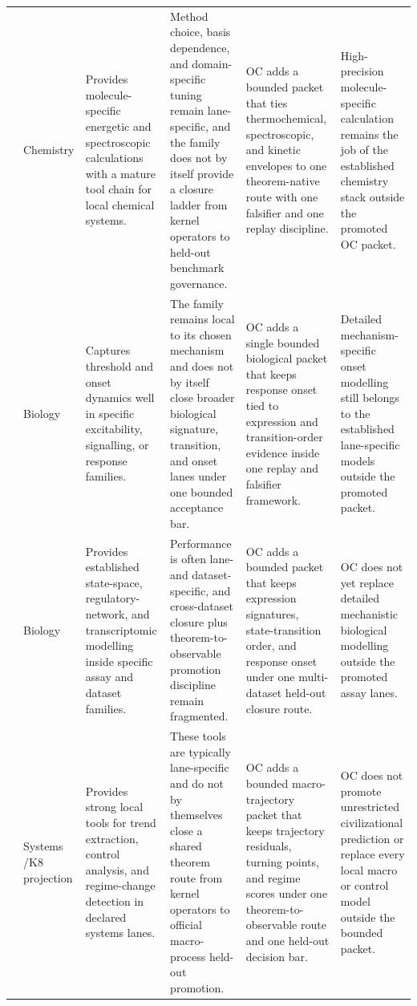 \begin{longtable}{@{}L{0.17\textwidth}L{0.09\textwidth}L{0.17\textwidth}L{0.17\textwidth}L{0.20\textwidth}L{0.14\textwidth}@{}}
 & Chemistry & Provides molecule-specific energetic and spectroscopic calculations with a mature tool chain for local chemical systems. & Method choice, basis dependence, and domain-specific tuning remain lane-specific, and the family does not by itself provide a closure ladder from kernel operators to held-out benchmark governance. & OC adds a bounded packet that ties thermochemical, spectroscopic, and kinetic envelopes to one theorem-native route with one falsifier and one replay discipline. & High-precision molecule-specific calculation remains the job of the established chemistry stack outside the promoted OC packet. \\
 & Biology & Captures threshold and onset dynamics well in specific excitability, signalling, or response families. & The family remains local to its chosen mechanism and does not by itself close broader biological signature, transition, and onset lanes under one bounded acceptance bar. & OC adds a single bounded biological packet that keeps response onset tied to expression and transition-order evidence inside one replay and falsifier framework. & Detailed mechanism-specific onset modelling still belongs to the established lane-specific models outside the promoted packet. \\
 & Biology & Provides established state-space, regulatory-network, and transcriptomic modelling inside specific assay and dataset families. & Performance is often lane- and dataset-specific, and cross-dataset closure plus theorem-to-observable promotion discipline remain fragmented. & OC adds a bounded packet that keeps expression signatures, state-transition order, and response onset under one multi-dataset held-out closure route. & OC does not yet replace detailed mechanistic biological modelling outside the promoted assay lanes. \\
 & Systems /\allowbreak K8 projection & Provides strong local tools for trend extraction, control analysis, and regime-change detection in declared systems lanes. & These tools are typically lane-specific and do not by themselves close a shared theorem route from kernel operators to official macro-process held-out promotion. & OC adds a bounded macro-trajectory packet that keeps trajectory residuals, turning points, and regime scores under one theorem-to-observable route and one held-out decision bar. & OC does not promote unrestricted civilizational prediction or replace every local macro or control model outside the bounded packet. \\

\end{longtable}
